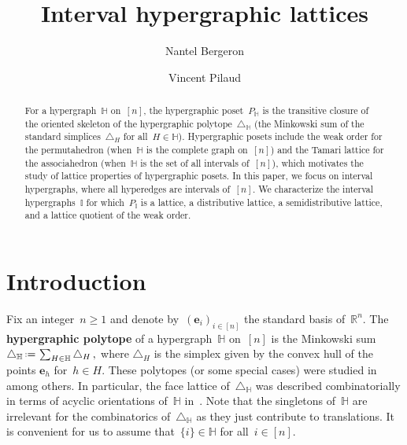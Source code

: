 \documentclass{amsart}
\title{Interval hypergraphic lattices}
\author[N.~Bergeron]{Nantel Bergeron}
\author{Vincent Pilaud}
\theoremstyle{definition}
\newcommand{\R}{\mathbb{R}} %
\renewcommand{\b}[1]{\boldsymbol{#1}} %
\newcommand{\eqdef}{\mbox{\,\raisebox{0.2ex}{\scriptsize\ensuremath{\mathrm:}}\ensuremath{=}\,}} %
\newcommand{\simplex}{\triangle} %
\newcommand{\defn}[1]{\textbf{\textsf{\color{PineGreen} #1}}} %
\newcommand{\HH}{\mathbb H}  %
\newcommand{\II}{\mathbb I} %
\begin{document}
\begin{abstract}
For a hypergraph~$\HH$ on~$[n]$, the hypergraphic poset~$P_\HH$ is the transitive closure of the oriented skeleton of the hypergraphic polytope~$\simplex_\HH$ (the Minkowski sum of the standard simplices~$\simplex_H$ for all~$H \in \HH$).
Hypergraphic posets include the weak order for the permutahedron (when~$\HH$ is the complete graph on~$[n]$) and the Tamari lattice for the associahedron (when~$\HH$ is the set of all intervals of~$[n]$), which motivates the study of lattice properties of hypergraphic posets.
In this paper, we focus on interval hypergraphs, where all hyperedges are intervals of~$[n]$.
We characterize the interval hypergraphs~$\II$ for which~$P_\II$ is a lattice, a distributive lattice, a semidistributive lattice, and a lattice quotient of the weak order.
\end{abstract}

\maketitle

\tableofcontents


\pagebreak

\section{Introduction}
\label{sec:introduction}

Fix an integer~$n \ge 1$ and denote by~$(\b{e}_i)_{i \in [n]}$ the standard basis of~$\R^n$.
The \defn{hypergraphic polytope} of a hypergraph~$\HH$ on~$[n]$ is the Minkowski sum
\(
\simplex_\HH \eqdef \sum_{H\in \HH} \simplex_H\,,
\)
where $\simplex_H$ is the simplex given by the convex hull of the points $\b{e}_h$ for~$h \in H$.
These polytopes (or some special cases) were studied in~\cite{FeichtnerSturmfels, Postnikov, PostnikovReinerWilliams, AgnarssonMorris, Agnarsson, AguiarArdila, BenedettiBergeronMachacek, PadrolPilaudPoullot-deformationConesHypergraphicPolytopes, Rehberg, CardinalSteiner, CardinalHoangMerinoMickaMutze} among others.
In particular, the face lattice of~$\simplex_\HH$ was described combinatorially in terms of acyclic orientations of~$\HH$ in~\cite{BenedettiBergeronMachacek}.
Note that the singletons of~$\HH$ are irrelevant for the combinatorics of~$\simplex_\HH$ as they just contribute to translations.
It is convenient for us to assume that~$\{i\} \in \HH$ for all~$i \in [n]$.
\end{document}

